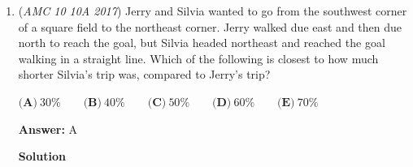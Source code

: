 \begin{enumerate}
 B is also equivalent to the contrapositive of the original statement, which implies that it must be true, so the answer is $\boxed{\textbf{(B)}\text{ If Lewis did not receive an A, then he got at least one of the multiple choice questions wrong.}}$.

 
            \begin{itemize}
        \item Note that answer choice (B) is the contrapositive of the given statement. (That is, it has been negated as well as reversed.) We know that the contrapositive is always true if the given statement is true.
            \end{itemize}
            



\textbf{Solution 2 (Elimination)}

Note: An A is usually 90\%-100\% of the questions correct.

 $\textbf{(A)}$ False. If Lewis did not receive an A, that does not mean he got \textit{all} the multiple-choice questions wrong. For example, he might get 19/20 or 18/20, which still accounts for an A.

 $\textbf{(B)}$ True. If Lewis did not receive an A, then he must have got at least one wrong. Otherwise, Lewis would have gotten an A.

 $\textbf{(C)}$ False. Again, Lewis can get 19/20 or 18/20, which is still an A. 

 $\textbf{(D)}$ False. The above situation can happen.

 $\textbf{(E)}$ False. Lewis can get 17/20 or less but it is not an A.

 Therefore, our answer is $\boxed{\textbf{(B)}}.$



	\item (\textit{AMC 10 10A 2017}) Jerry and Silvia wanted to go from the southwest corner of a square field to the northeast corner. Jerry walked due east and then due north to reach the goal, but Silvia headed northeast and reached the goal walking in a straight line. Which of the following is closest to how much shorter Silvia's trip was, compared to Jerry's trip?


 $\textbf{(A)}\ 30\%\qquad\textbf{(B)}\ 40\%\qquad\textbf{(C)}\ 50\%\qquad\textbf{(D)}\ 60\%\qquad\textbf{(E)}\ 70\%$

 \textbf{Answer: }A



\textbf{Solution}


\end{enumerate}
